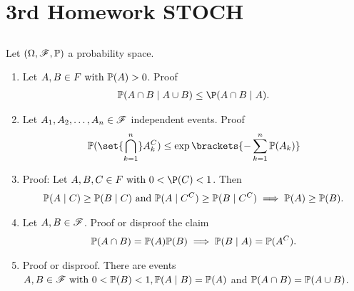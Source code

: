 
\section{3rd Homework STOCH}
\subsection{}
Let $(\Omega, \mathscr{F}, \mathbb{P})$ a probability space.
\begin{enumerate}
	\item Let $A,B \in F \text{ with } \mathbb{P}(A) >0$. Proof
	\begin{align*}
		\meas(A\cap B \mid A\cup B) \le \P(A \cap B \mid A).
	\end{align*}
	\item Let $A_1 , A_2 , \dots , A_n \in \mathscr{F}$ independent events. Proof
	\begin{align*}
		\meas(\set{\bigcap_{k=1}^n} A^C_k) \le \exp\brackets{- \sum_{k=1}^{n} \meas(A_k)}
	\end{align*}
	\item Proof: Let $A,B,C \in F \with 0 < \P(C) < 1$. Then
	\begin{align*}
		\mathbb{P}(A\mid C) \ge \mathbb{P}(B \mid C) \text{ and } \mathbb{P}(A \mid C^C) \ge \mathbb{P}(B \mid C^C) \implies \mathbb{P}(A) \ge \mathbb{P}(B).
	\end{align*}
	\item Let $A, B \in \mathscr{F}$. Proof or disproof the claim
	\begin{align*}
		\mathbb{P}(A\cap B) = \mathbb{P}(A)\mathbb{P}(B) \implies \mathbb{P}(B \mid A) = \mathbb{P}(A^C).
	\end{align*}
	\item Proof or disproof. There are events $A,B \in \mathscr{F} \text{ with } 0 < \mathbb{P}(B) < 1, \mathbb{P}(A\mid B) = \mathbb{P}(A)$ and $\mathbb{P}(A \cap B) = \mathbb{P}(A \cup B)$.
\end{enumerate}
